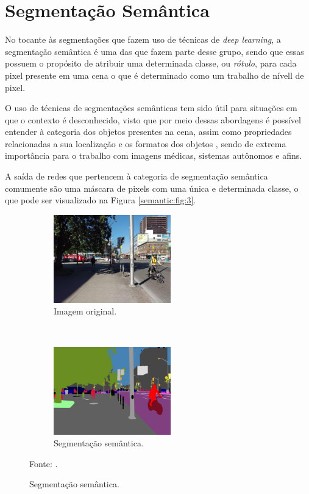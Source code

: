 \clearpage
\newpage
\section{Segmentação Semântica}
\label{semantic:semantic}

No tocante às segmentações que fazem uso de técnicas de \textit{deep learning}, a segmentação semântica é uma das que fazem parte desse grupo, sendo que essas possuem o propósito de atribuir uma determinada classe, ou \textit{rótulo}, para cada pixel presente em uma cena \cite{Wang2017, Ghosh2019, Shelhamer2016, Arbelaez2012,Zhang2018} o que é determinado como um trabalho de nívell de pixel.

O uso de técnicas de segmentações semânticas tem sido útil para situações em que o contexto é desconhecido, visto que por meio dessas abordagens é possível entender à categoria dos objetos presentes na cena, assim como propriedades relacionadas a sua localização e os formatos dos objetos \cite{Zhang2018}, sendo de extrema importância para o trabalho com imagens médicas, sistemas autônomos e afins.

A saída de redes que pertencem à categoria de segmentação semântica comumente são uma máscara de 
pixels com uma única e determinada classe, o que pode ser visualizado na Figura \ref{semantic:fig:3}.

\begin{figure}[H]
   \caption{Segmentação semântica.}
   \centering
   \label{semantic:fig:3}
    \begin{subfigure}[t]{0.45\textwidth}
        \centering
        \includegraphics[height=1.5in]{recursos/imagens/semantic/t1.jpg}
        \caption{Imagem original.}
        \label{semantic:fig:3.1}
    \end{subfigure}%
    ~ 
    \begin{subfigure}[t]{0.45\textwidth}
        \centering
        \includegraphics[height=1.5in]{recursos/imagens/semantic/s1.png}
        \caption{Segmentação semântica.}
        \label{semantic:fig:3.2}
    \end{subfigure}%

    \vspace*{1 cm}
    Fonte: \cite{Neuhold2017_ICCV}.
\end{figure}

